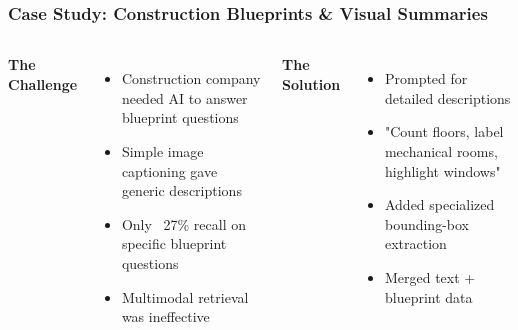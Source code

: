 \begin{frame}
    \frametitle{Case Study: Construction Blueprints \& Visual Summaries}
    
    \begin{columns}
        \textbf{The Challenge}
        \begin{itemize}
            \item Construction company needed AI to answer blueprint questions
            \item Simple image captioning gave generic descriptions
            \item Only ~27\% recall on specific blueprint questions
            \item Multimodal retrieval was ineffective
        \end{itemize}
        
        \textbf{The Solution}
        \begin{itemize}
            \item Prompted for detailed descriptions
            \item "Count floors, label mechanical rooms, highlight windows"
            \item Added specialized bounding-box extraction
            \item Merged text + blueprint data
        \end{itemize}
    \end{columns}
    
    \vspace{0.3cm}
    \begin{center}
    \end{center}
\end{frame}

